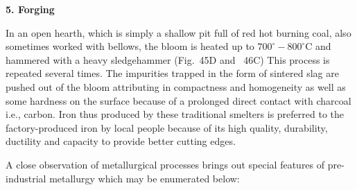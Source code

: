 \noindent \textbf{\large 5.  Forging}

In an open hearth, which is simply a shallow pit full of red hot burning coal, also sometimes worked with bellows, the bloom is heated up to $700^\circ-800^\circ$C and hammered with a heavy sledgehammer (Fig.~45D and ~46C) This process is repeated several times. The impurities trapped in the form of sintered slag are pushed out of the bloom attributing in compactness and homogeneity as well as some hardness on the surface because of a prolonged direct contact with charcoal i.e., carbon. Iron thus produced by these traditional smelters is preferred to the factory-produced iron by local people because of its high quality, durability, ductility and capacity to provide better cutting edges.	

A close observation of metallurgical processes brings out special features of pre-industrial metallurgy which may be enumerated below:

